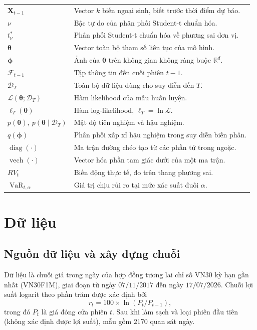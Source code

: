 \documentclass[12pt,a4paper]{article}
\numberwithin{equation}{section}
\theoremstyle{definition}
\newcommand{\R}{\mathbb{R}}
\newcommand{\diag}{\operatorname{diag}}
\newcommand{\VaR}{\operatorname{VaR}}
\newcommand{\Data}{\mathcal{D}}
\newcommand{\Info}{\mathcal{F}}
\newcommand{\Param}{\symbf{\theta}}
\newcommand{\Xvec}{\symbf{X}}
\newcommand{\vecphi}{\symbf{\phi}}
\newcommand{\vech}{\operatorname{vech}}
\begin{document}
{\begin{longtable}{@{}p{3.0cm}>{\raggedright\arraybackslash}p{12.2cm}@{}}
			$\Xvec_{t-1}$ & Vector $k$ biến ngoại sinh, biết trước thời điểm dự báo. \\
			$\nu$ & Bậc tự do của phân phối Student-t chuẩn hóa. \\
			$t^{*}_{\nu}$ & Phân phối Student-t chuẩn hóa về phương sai đơn vị. \\
			$\Param$ & Vector toàn bộ tham số liên tục của mô hình. \\
			$\vecphi$ & Ảnh của $\Param$ trên không gian không ràng buộc $\R^{d}$. \\
			$\Info_{t-1}$ & Tập thông tin đến cuối phiên $t-1$. \\
			$\Data_T$ & Toàn bộ dữ liệu dùng cho suy diễn đến $T$. \\
			$\mathcal{L}(\Param;\Data_T)$ & Hàm likelihood của mẫu huấn luyện. \\
			$\ell_T(\Param)$ & Hàm log-likelihood, $\ell_T=\ln\mathcal{L}$. \\
			$p(\Param),\ p(\Param\mid\Data_T)$ & Mật độ tiên nghiệm và hậu nghiệm. \\
			$q(\vecphi)$ & Phân phối xấp xỉ hậu nghiệm trong suy diễn biến phân. \\
			$\diag(\cdot)$ & Ma trận đường chéo tạo từ các phần tử trong ngoặc. \\
			$\vech(\cdot)$ & Vector hóa phần tam giác dưới của một ma trận. \\
			$RV_t$ & Biến động thực tế, đo trên thang phương sai. \\
			$\VaR_{t,\alpha}$ & Giá trị chịu rủi ro tại mức xác suất đuôi $\alpha$. \\
		\end{longtable}
	}
	
	\newpage
	
	\section{Dữ liệu}\label{sec:data}
	
	\subsection{Nguồn dữ liệu và xây dựng chuỗi}\label{subsec:data-source}
	Dữ liệu là chuỗi giá trong ngày của hợp đồng tương lai chỉ số VN30 kỳ hạn gần nhất
	(VN30F1M), giai đoạn từ ngày $07/11/2017$ đến ngày $17/07/2026$. Chuỗi lợi suất logarit
	theo phần trăm được xác định bởi
	\begin{equation}
		r_t = 100\times\ln\!\left(P_t/P_{t-1}\right),
		\label{eq:return}
	\end{equation}
	trong đó $P_t$ là giá đóng cửa phiên $t$. Sau khi làm sạch và loại phiên đầu tiên (không
	xác định được lợi suất), mẫu gồm $2170$ quan sát ngày.
	
\end{document}
